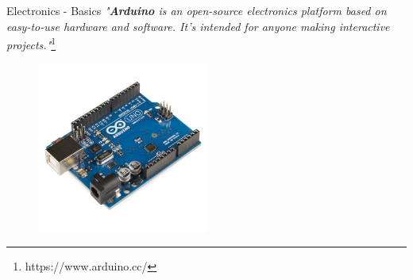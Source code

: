 \documentclass{beamer}
\begin{document}
\begin{frame}{Electronics - Basics}
   \textit{"\textbf{Arduino} is an open-source electronics platform based on easy-to-use hardware and software. It's intended for anyone making interactive projects."}\footnote{https://www.arduino.cc/}
    \vspace{5mm}
    \begin{figure}[h]
        \includegraphics[width=0.5\textwidth]{arduino.jpg}
    \end{figure}
\end{frame}
\end{document}
